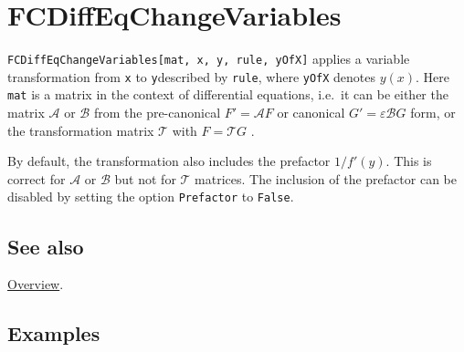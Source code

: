 \documentclass[../FeynCalcManual.tex]{subfiles}
\begin{document}
\hypertarget{fcdiffeqchangevariables}{
\section{FCDiffEqChangeVariables}\label{fcdiffeqchangevariables}}

\texttt{FCDiffEqChangeVariables[\allowbreak{}mat,\ \allowbreak{}x,\ \allowbreak{}y,\ \allowbreak{}rule,\ \allowbreak{}yOfX]}
applies a variable transformation from \texttt{x} to \texttt{y}described
by \texttt{rule}, where \texttt{yOfX} denotes \(y(x)\). Here
\texttt{mat} is a matrix in the context of differential equations,
i.e.~it can be either the matrix \(\mathcal{A}\) or \(\mathcal{B}\) from
the pre-canonical \(F' = \mathcal{A} F\) or canonical
\(G' = \varepsilon \mathcal{B} G\) form, or the transformation matrix
\(\mathcal{T}\) with \(F = \mathcal{T} G\) .

By default, the transformation also includes the prefactor \(1/f'(y)\).
This is correct for \(\mathcal{A}\) or \(\mathcal{B}\) but not for
\(\mathcal{T}\) matrices. The inclusion of the prefactor can be disabled
by setting the option \texttt{Prefactor} to \texttt{False}.

\subsection{See also}

\hyperlink{toc}{Overview}.

\subsection{Examples}
\end{document}
